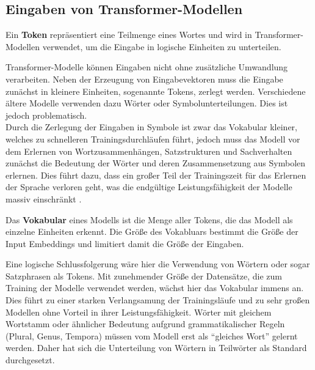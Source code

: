 
\subsection{Eingaben von Transformer-Modellen}
\begin{definition}\label{def:token}
    Ein \textbf{Token} repräsentiert eine Teilmenge eines Wortes und wird in Transformer-Modellen verwendet, um die Eingabe in logische Einheiten zu unterteilen.
\end{definition}
Transformer-Modelle können Eingaben nicht ohne zusätzliche Umwandlung verarbeiten.
Neben der Erzeugung von Eingabevektoren muss die Eingabe zunächst in kleinere Einheiten, sogenannte Tokens, zerlegt werden.
Verschiedene ältere Modelle verwenden dazu Wörter oder Symbolunterteilungen.
Dies ist jedoch problematisch.\\

Durch die Zerlegung der Eingaben in Symbole ist zwar das Vokabular kleiner, welches zu schnelleren Trainingsdurchläufen führt, jedoch muss das Modell vor dem Erlernen von Wortzusammenhängen, Satzstrukturen und Sachverhalten zunächst die Bedeutung der Wörter und deren Zusammensetzung aus Symbolen erlernen.
Dies führt dazu, dass ein großer Teil der Trainingszeit für das Erlernen der Sprache verloren geht, was die endgültige Leistungsfähigkeit der Modelle massiv einschränkt \citep{bpe}.\\

\begin{definition}\label{def:vokabular}
    Das \textbf{Vokabular} eines Modells ist die Menge aller Tokens, die das Modell als einzelne Einheiten erkennt. Die Größe des Vokabluars bestimmt die Größe der Input Embeddings und limitiert damit die Größe der Eingaben.
\end{definition}

Eine logische Schlussfolgerung wäre hier die Verwendung von Wörtern oder sogar Satzphrasen als Tokens.
Mit zunehmender Größe der Datensätze, die zum Training der Modelle verwendet werden, wächst hier das Vokabular immens an.
Dies führt zu einer starken Verlangsamung der Trainingsläufe und zu sehr großen Modellen ohne Vorteil in ihrer Leistungsfähigkeit.
Wörter mit gleichem Wortstamm oder ähnlicher Bedeutung aufgrund grammatikalischer Regeln (Plural, Genus, Tempora) müssen vom Modell erst als \enquote{gleiches Wort} gelernt werden.
Daher hat sich die Unterteilung von Wörtern in Teilwörter als Standard durchgesetzt.

